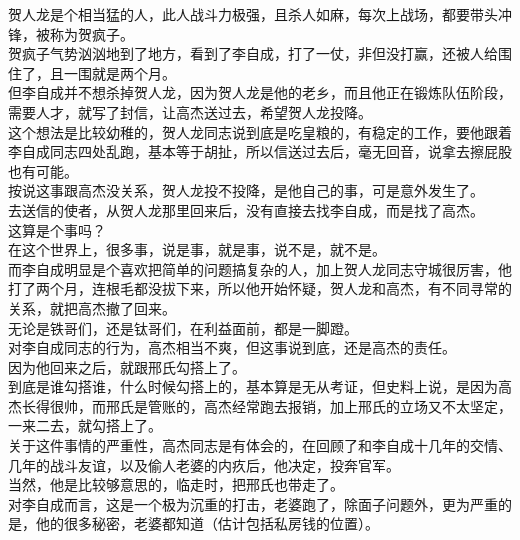 \begin{multicols}{\theparacolNo}
贺人龙是个相当猛的人，此人战斗力极强，且杀人如麻，每次上战场，都要带头冲锋，被称为贺疯子。\\

贺疯子气势汹汹地到了地方，看到了李自成，打了一仗，非但没打赢，还被人给围住了，且一围就是两个月。\\

但李自成并不想杀掉贺人龙，因为贺人龙是他的老乡，而且他正在锻炼队伍阶段，需要人才，就写了封信，让高杰送过去，希望贺人龙投降。\\

这个想法是比较幼稚的，贺人龙同志说到底是吃皇粮的，有稳定的工作，要他跟着李自成同志四处乱跑，基本等于胡扯，所以信送过去后，毫无回音，说拿去擦屁股也有可能。\\

按说这事跟高杰没关系，贺人龙投不投降，是他自己的事，可是意外发生了。\\

去送信的使者，从贺人龙那里回来后，没有直接去找李自成，而是找了高杰。\\

这算是个事吗？\\

在这个世界上，很多事，说是事，就是事，说不是，就不是。\\

而李自成明显是个喜欢把简单的问题搞复杂的人，加上贺人龙同志守城很厉害，他打了两个月，连根毛都没拔下来，所以他开始怀疑，贺人龙和高杰，有不同寻常的关系，就把高杰撤了回来。\\

无论是铁哥们，还是钛哥们，在利益面前，都是一脚蹬。\\

对李自成同志的行为，高杰相当不爽，但这事说到底，还是高杰的责任。\\

因为他回来之后，就跟邢氏勾搭上了。\\

到底是谁勾搭谁，什么时候勾搭上的，基本算是无从考证，但史料上说，是因为高杰长得很帅，而邢氏是管账的，高杰经常跑去报销，加上邢氏的立场又不太坚定，一来二去，就勾搭上了。\\

关于这件事情的严重性，高杰同志是有体会的，在回顾了和李自成十几年的交情、几年的战斗友谊，以及偷人老婆的内疚后，他决定，投奔官军。\\

当然，他是比较够意思的，临走时，把邢氏也带走了。\\

对李自成而言，这是一个极为沉重的打击，老婆跑了，除面子问题外，更为严重的是，他的很多秘密，老婆都知道（估计包括私房钱的位置）。\\


\end{multicols}
